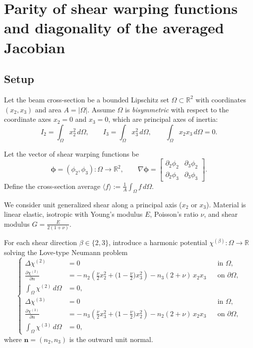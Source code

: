 \section{Parity of shear warping functions and diagonality of the averaged Jacobian}

\subsection*{Setup}
Let the beam cross-section be a bounded Lipschitz set \(\Omega\subset\mathbb{R}^2\) with coordinates \((x_2,x_3)\) and area \(A=|\Omega|\).
Assume \(\Omega\) is \emph{bisymmetric} with respect to the coordinate axes \(x_2=0\) and \(x_3=0\), which are principal axes of inertia:
\[
I_2=\int_\Omega x_2^2\,d\Omega,\qquad I_3=\int_\Omega x_3^2\,d\Omega,\qquad \int_\Omega x_2 x_3\,d\Omega=0.
\]

Let the vector of shear warping functions be
\[
\boldsymbol\phi=(\phi_2,\phi_3):\Omega\to\mathbb{R}^2,\qquad 
\nabla\boldsymbol\phi=
\begin{bmatrix}
\partial_{2}\phi_2 & \partial_{3}\phi_2\\
\partial_{2}\phi_3 & \partial_{3}\phi_3
\end{bmatrix}.
\]
Define the cross-section average \(\langle f\rangle := \frac{1}{A}\int_\Omega f\,d\Omega\).

We consider unit generalized shear along a principal axis (\(x_2\) or \(x_3\)). Material is linear elastic, isotropic with Young’s modulus \(E\), Poisson’s ratio \(\nu\), and shear modulus \(G=\tfrac{E}{2(1+\nu)}\).

For each shear direction \(\beta\in\{2,3\}\), introduce a harmonic potential \(\chi^{(\beta)}:\Omega\to\mathbb{R}\) solving the Love-type Neumann problem
\begin{equation*}
\left\{
\begin{aligned}
\Delta \chi^{(2)} &= 0 && \text{in }\Omega,\\
\frac{\partial \chi^{(2)}}{\partial n} &= -\,n_2\!\left(\tfrac{\nu}{2}x_2^2+\Big(1-\tfrac{\nu}{2}\Big)x_3^2\right) - n_3 (2+\nu)\,x_2x_3 && \text{on }\partial\Omega,\\
\int_\Omega \chi^{(2)}\,d\Omega &= 0, \\
\Delta \chi^{(3)} &= 0 && \text{in }\Omega,\\
\frac{\partial \chi^{(3)}}{\partial n} &= -\,n_3\!\left(\tfrac{\nu}{2}x_3^2+\Big(1-\tfrac{\nu}{2}\Big)x_2^2\right) - n_2 (2+\nu)\,x_2x_3 && \text{on }\partial\Omega,\\
\int_\Omega \chi^{(3)}\,d\Omega &= 0,
\end{aligned}\right.
\end{equation*}
where \(\boldsymbol n=(n_2,n_3)\) is the outward unit normal.

